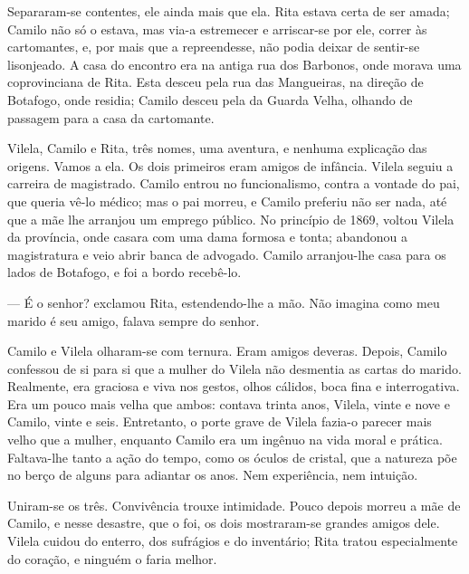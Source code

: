 Separaram-se contentes, ele ainda mais que ela. Rita estava certa de ser
amada; Camilo não só o estava, mas via-a estremecer e arriscar-se por
ele, correr às cartomantes, e, por mais que a repreendesse, não podia
deixar de sentir-se lisonjeado. A casa do encontro era na antiga rua dos
Barbonos, onde morava uma coprovinciana de Rita. Esta desceu pela rua
das Mangueiras, na direção de Botafogo, onde residia; Camilo desceu pela
da Guarda Velha, olhando de passagem para a casa da cartomante.

Vilela, Camilo e Rita, três nomes, uma aventura, e nenhuma explicação
das origens. Vamos a ela. Os dois primeiros eram amigos de infância.
Vilela seguiu a carreira de magistrado. Camilo entrou no funcionalismo,
contra a vontade do pai, que queria vê-lo médico; mas o pai morreu, e
Camilo preferiu não ser nada, até que a mãe lhe arranjou um emprego
público. No princípio de 1869, voltou Vilela da província, onde casara
com uma dama formosa e tonta; abandonou a magistratura e veio abrir
banca de advogado. Camilo arranjou-lhe casa para os lados de Botafogo, e
foi a bordo recebê-lo.

--- É o senhor? exclamou Rita, estendendo-lhe a mão. Não imagina como meu
marido é seu amigo, falava sempre do senhor.

Camilo e Vilela olharam-se com ternura. Eram amigos deveras. Depois,
Camilo confessou de si para si que a mulher do Vilela não desmentia as
cartas do marido. Realmente, era graciosa e viva nos gestos, olhos
cálidos, boca fina e interrogativa. Era um pouco mais velha que ambos:
contava trinta anos, Vilela, vinte e nove e Camilo, vinte e seis.
Entretanto, o porte grave de Vilela fazia-o parecer mais velho que a
mulher, enquanto Camilo era um ingênuo na vida moral e prática.
Faltava-lhe tanto a ação do tempo, como os óculos de cristal, que a
natureza põe no berço de alguns para adiantar os anos. Nem experiência,
nem intuição.

Uniram-se os três. Convivência trouxe intimidade. Pouco depois morreu a
mãe de Camilo, e nesse desastre, que o foi, os dois mostraram-se grandes
amigos dele. Vilela cuidou do enterro, dos sufrágios e do inventário;
Rita tratou especialmente do coração, e ninguém o faria melhor.

